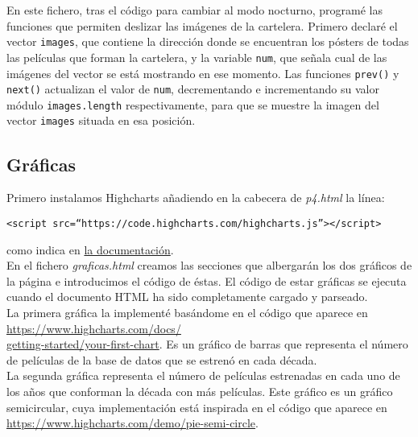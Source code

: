 \documentclass{article}
\begin{document}
En este fichero, tras el código para cambiar al modo nocturno, programé las funciones que permiten deslizar las imágenes de la cartelera. Primero declaré el vector \texttt{images}, que contiene la dirección donde se encuentran los pósters de todas las películas que forman la cartelera, y la variable \texttt{num}, que señala cual de las imágenes del vector se está mostrando en ese momento. Las funciones \texttt{prev()} y \texttt{next()} actualizan el valor de \texttt{num}, decrementando e incrementando su valor módulo \texttt{images.length} respectivamente, para que se muestre la imagen del vector \texttt{images} situada en esa posición.

\subsection{Gráficas}

Primero instalamos Highcharts añadiendo en la cabecera de \textit{p4.html} la línea:
\vspace{-1mm}
\begin{center}
  \texttt{<script src=``https://code.highcharts.com/highcharts.js''></script>}
\end{center}

como indica en \href{https://www.highcharts.com/docs/getting-started/installation}{la documentación}.\\

En el fichero \textit{graficas.html} creamos las secciones que albergarán los dos gráficos de la página e introducimos el código de éstas. El código de estar gráficas se ejecuta cuando el documento HTML ha sido completamente cargado y parseado.\\

La primera gráfica la implementé basándome en el código que aparece en \href{https://www.highcharts.com/docs/getting-started/your-first-chart}{https://www.highcharts.com/docs/\\getting-started/your-first-chart}. Es un gráfico de barras que representa el número de películas de la base de datos que se estrenó en cada década.\\

La segunda gráfica representa el número de películas estrenadas en cada uno de los años que conforman la década con más películas. Este gráfico es un gráfico semicircular, cuya implementación está inspirada en el código que aparece en  \href{https://www.highcharts.com/demo/pie-semi-circle}{https://www.highcharts.com/demo/pie-semi-circle}.\\
\end{document}

